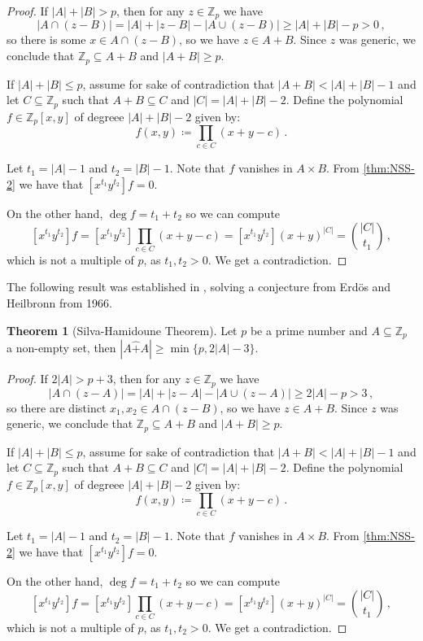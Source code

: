 \documentclass[12pt]{amsart}
\theoremstyle{definition}
\newtheorem{thm}{Theorem}[section]
\newcommand{\Z}{\mathbb{Z}}
\begin{document}
\begin{proof}
If $|A| + |B| > p$, then for any $z \in \Z_p$ we have 
$$ |A \cap (z - B)| = |A| + |z-B| - |A \cup (z-B)| \geq |A| + |B| - p > 0 \, ,$$
so there is some $x \in A \cap (z - B)$, so we have $z \in A + B$.
Since $z$ was generic, we conclude that $\Z_p \subseteq A+B$ and $|A+B| \geq p$.


If $|A| + |B| \leq p$, assume for sake of contradiction that $|A+B| < |A| + |B| - 1$ and let $C \subseteq \Z_p$ such that $A+B \subseteq C $ and $|C| = |A| + |B| - 2$.
Define the polynomial $f \in \Z_p[x, y]$ of degreee $|A|+|B|-2$ given by:
$$ f(x, y) \coloneqq \prod_{c \in C} (x + y - c) \, . $$

Let $t_1 = |A| - 1$ and $t_2 = |B| -1 $.
Note that $f$ vanishes in $A\times B$.
From \cref{thm:NSS-2} we have that $[x^{t_1} y^{t_2}] f = 0 $.

On the other hand, $\deg f = t_1+t_2$ so we can compute 
$$[x^{t_1} y^{t_2}] f = [x^{t_1} y^{t_2}]\prod_{c \in C} (x + y - c) = [x^{t_1} y^{t_2}] (x+y)^{|C|} = \binom{|C|}{t_1} \, , $$
which is not a multiple of $p$, as $t_1, t_2 > 0$.
We get a contradiction.
\end{proof}

The following result was established in \cite{da1994cyclic}, solving a conjecture from Erd\"os and Heilbronn from 1966.

\begin{thm}[Silva-Hamidoune Theorem]
Let $p$ be a prime number and $A\subseteq \Z_p$ a non-empty set, then $|A\hat{+}A| \geq \min \{p, 2|A| - 3\}$.
\end{thm}

\begin{proof}
If $2|A| > p + 3$, then for any $z \in \Z_p$ we have 
$$ |A \cap (z - A)| = |A| + |z-A| - |A \cup (z-A)| \geq 2|A| - p > 3 \, ,$$
so there are distinct $x_1, x_2 \in A \cap (z - B)$, so we have $z \in A + B$.
Since $z$ was generic, we conclude that $\Z_p \subseteq A+B$ and $|A+B| \geq p$.


If $|A| + |B| \leq p$, assume for sake of contradiction that $|A+B| < |A| + |B| - 1$ and let $C \subseteq \Z_p$ such that $A+B \subseteq C $ and $|C| = |A| + |B| - 2$.
Define the polynomial $f \in \Z_p[x, y]$ of degreee $|A|+|B|-2$ given by:
$$ f(x, y) \coloneqq \prod_{c \in C} (x + y - c) \, . $$

Let $t_1 = |A| - 1$ and $t_2 = |B| -1 $.
Note that $f$ vanishes in $A\times B$.
From \cref{thm:NSS-2} we have that $[x^{t_1} y^{t_2}] f = 0 $.

On the other hand, $\deg f = t_1+t_2$ so we can compute 
$$[x^{t_1} y^{t_2}] f = [x^{t_1} y^{t_2}]\prod_{c \in C} (x + y - c) = [x^{t_1} y^{t_2}] (x+y)^{|C|} = \binom{|C|}{t_1} \, , $$
which is not a multiple of $p$, as $t_1, t_2 > 0$.
We get a contradiction.
\end{proof}
\end{document}
